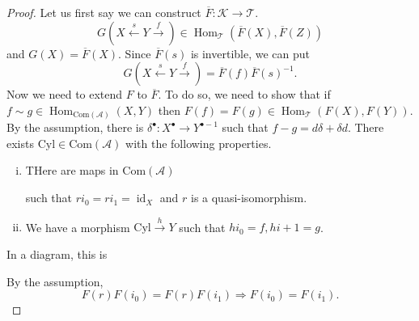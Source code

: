 \documentclass[10pt]{article}
\numberwithin{equation}{section}
\DeclareMathOperator{\Hom}{Hom}
\DeclareMathOperator{\id}{id}
\newcommand{\cK}[0]{\mathcal{K}}
\newcommand{\sA}[0]{\mathscr{A}}
\newcommand{\sT}[0]{\mathscr{T}}
\newcommand{\Com}[0]{\mathrm{Com}}
\begin{document}
\begin{proof}
    Let us first say we can construct $\overline{F}:\cK\to \sT$. 
    \begin{equation*}
        G(X\stackrel{s}{\leftarrow}Y\stackrel{f}{\rightarrow}) \in \Hom_\sT(\overline{F}(X),\overline{F}(Z))
    \end{equation*}
    and $G(X) = \overline{F}(X)$. Since $\overline{F}(s)$ is invertible, we can put 
    \begin{equation*}
        G(X\stackrel{s}{\leftarrow}Y\stackrel{f}{\rightarrow}) = \overline{F}(f)\overline{F}(s)^{-1}.
    \end{equation*}
    Now we need to extend $F$ to $\overline{F}$. To do so, we need to show that if $f\sim g\in\Hom_{\Com(\sA)}(X,Y)$ then $F(f) = F(g)\in\Hom_\sT(F(X),F(Y))$. 
    By the assumption, there is $\delta^\bullet:X^\bullet\to Y^{\bullet-1}$ such that $f-g = d\delta +\delta d$. There exists $\mathrm{Cyl}\in\Com(\sA)$ with the following properties.
    \begin{enumerate}[i.]
        \item THere are maps in $\Com(\sA)$
        \begin{center}
        \end{center}
        such that $ri_0 = ri_1 = \id_X$ and $r$ is a quasi-isomorphism.
        \item We have a morphism $\mathrm{Cyl}\stackrel{h}{\to}Y$ such that $hi_0=f,hi+1 = g$.
    \end{enumerate}
    In a diagram, this is 
    \begin{center}
    \end{center}
    By the assumption,
    \begin{equation*}
        F(r)F(i_0) = F(r)F(i_1)\Rightarrow F(i_0)=F(i_1).
    \end{equation*}

\end{proof}
\end{document}
